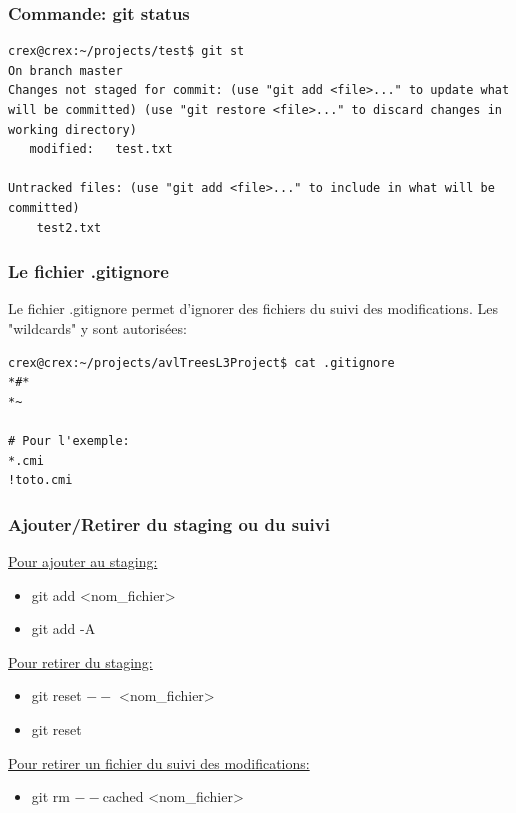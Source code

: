 \documentclass{beamer}
\begin{document}
\begin{frame}[fragile]
\frametitle{Commande: git status}

    \begin{mdframed}[style=Bash]
    \begin{lstlisting}[style=Bash, caption={git status modification de test.txt}]
crex@crex:~/projects/test$ git st
On branch master
Changes not staged for commit: (use "git add <file>..." to update what will be committed) (use "git restore <file>..." to discard changes in working directory)
   modified:   test.txt

Untracked files: (use "git add <file>..." to include in what will be committed)
	test2.txt
    \end{lstlisting}
    \end{mdframed}

\end{frame}

\begin{frame}[fragile]
\frametitle{Le fichier .gitignore}
Le fichier .gitignore permet d'ignorer des fichiers du suivi des modifications. Les "wildcards" y sont autorisées:
\medskip
\begin{mdframed}[style=Bash]
    \begin{lstlisting}[style=Bash, caption={Contenu du dossier .git/}]
crex@crex:~/projects/avlTreesL3Project$ cat .gitignore 
*#*
*~

# Pour l'exemple:
*.cmi
!toto.cmi
    \end{lstlisting}
    \end{mdframed}
\end{frame}

\begin{frame}
\frametitle{Ajouter/Retirer du staging ou du suivi}

\underline{Pour ajouter au staging:}
\smallskip
\begin{itemize}
    \item[] git add <nom\_fichier>
    \item[] git add -A
\end{itemize}
\bigskip

\underline{Pour retirer du staging:}
\smallskip
\begin{itemize}
    \item[] git reset $--$ <nom\_fichier>
    \item[] git reset
\end{itemize}
\bigskip

\underline{Pour retirer un fichier du suivi des modifications:}
\smallskip
\begin{itemize}
    \item[] git rm $--$cached <nom\_fichier>
\end{itemize}
\end{frame}
\end{document}
